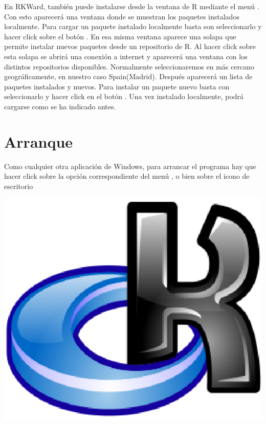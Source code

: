En RKWard, también puede instalarse desde la ventana de R mediante el menú .
Con esto aparecerá una ventana donde se muestran los paquetes instalados localmente.
Para cargar un paquete instalado localmente basta son seleccionarlo y hacer click sobre el botón .
En esa misma ventana aparece una solapa  que permite instalar nuevos paquetes desde un
repositorio de R.
Al hacer click sobre esta solapa se abrirá una conexión a internet y aparecerá una ventana con los distintos
repositorios disponibles. Normalmente seleccionaremos en más cercano geográficamente, en nuestro caso Spain(Madrid).
Después aparecerá un lista de paquetes instalados y nuevos.
Para instalar un paquete nuevo basta con seleccionarlo y hacer click en el botón .
Una vez instalado localmente, podrá cargarse como se ha indicado antes.


\section{Arranque}
Como cualquier otra aplicación de Windows, para arrancar el programa hay que hacer click sobre la opción
correspondiente del menú , o bien sobre el icono de escritorio
\begin{center}
  \includegraphics[scale=0.3]{introduccion_r/img/icono_rkward}
\end{center}

